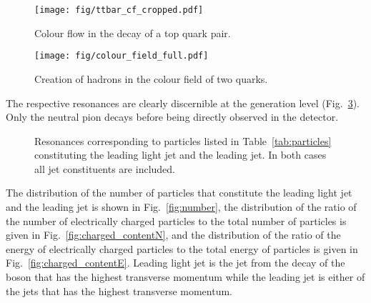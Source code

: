 \begin{figure}[hbtp]

\centering
\texttt{[image: fig/ttbar\_cf\_cropped.pdf]}
\caption{Colour flow in the decay of a top quark pair.}
\label{fig:ttbar_cf}

\end{figure}

\begin{figure}[hbtp]
\centering
\texttt{[image: fig/colour\_field\_full.pdf]}
\caption{Creation of hadrons in the colour field of two quarks.}
\label{fig:colour_field}
\end{figure}

The respective resonances are clearly discernible at the generation level (Fig.~\ref{fig:mass_resonances}). Only the neutral pion decays before being directly observed in the detector.

\begin{figure}[htbp]
\centering
\def\twidth{0.45}
\caption{Resonances corresponding to particles listed in Table~\protect\ref{tab:particles} constituting the leading light jet and the leading \cPqb jet. In both cases all jet constituents are included.}
\label{fig:mass_resonances}
\end{figure}

The distribution of the number of particles that constitute the leading light jet and the leading \cPqb jet is shown in Fig.~\ref{fig:number}, the distribution of the ratio of the number of electrically charged particles to the total number of particles is given in Fig.~\ref{fig:charged_contentN}, and the distribution of the ratio of the energy of electrically charged particles to the total energy of particles is given in Fig.~\ref{fig:charged_contentE}. Leading light jet is the jet from the decay of the \PW boson that has the highest transverse momentum \pt while the leading \cPqb jet is either of the \cPqb jets that has the highest transverse momentum.

